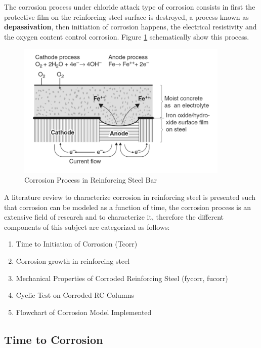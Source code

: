The corrosion process under chloride attack type of corrosion consists in first the protective film  on the reinforcing steel surface is destroyed, a process known as \textbf{depassivation}, then initiation of corrosion happens, the electrical resistivity and the oxygen content control corrosion. Figure \ref{fig:corr1} schematically show this process.

\begin{figure}[htbp]
\centering
\includegraphics[width=0.9\textwidth]{Chapter-4/figs/Corrosion_Process}
\caption{Corrosion Process in Reinforcing Steel Bar \cite{Mehta2014}}
\label{fig:corr1}
\end{figure}


A literature review to characterize corrosion in reinforcing steel is presented such that corrosion can be modeled as a function of time, the corrosion process is an extensive field of research and to characterize it, therefore the different components of this subject are categorized as follows:

\begin{enumerate}
	\item Time to Initiation of Corrosion (Tcorr)
	\item Corrosion growth in reinforcing steel
	\item Mechanical Properties of Corroded Reinforcing Steel (fycorr, fucorr)
	\item Cyclic Test on Corroded RC Columns
	\item Flowchart of Corrosion Model Implemented
\end{enumerate}

 
\subsection{Time to Corrosion}

